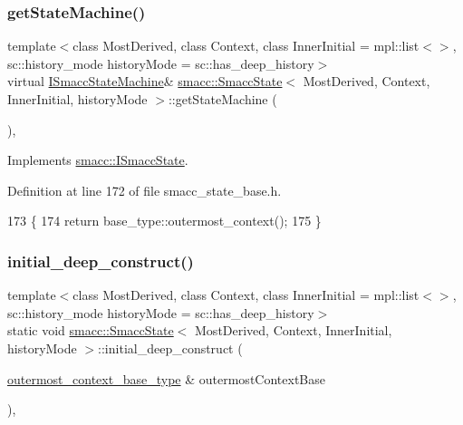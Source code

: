 \subsubsection{\texorpdfstring{get\+State\+Machine()}{getStateMachine()}}
{\footnotesize\ttfamily template$<$class Most\+Derived, class Context, class Inner\+Initial = mpl\+::list$<$$>$, sc\+::history\+\_\+mode history\+Mode = sc\+::has\+\_\+deep\+\_\+history$>$ \\
virtual \hyperlink{classsmacc_1_1ISmaccStateMachine}{I\+Smacc\+State\+Machine}\& \hyperlink{classsmacc_1_1SmaccState}{smacc\+::\+Smacc\+State}$<$ Most\+Derived, Context, Inner\+Initial, history\+Mode $>$\+::get\+State\+Machine (\begin{DoxyParamCaption}{ }\end{DoxyParamCaption})\hspace{0.3cm}{\ttfamily [inline]}, {\ttfamily [virtual]}}



Implements \hyperlink{classsmacc_1_1ISmaccState_a562bb3f9a3ac16b8be71e4794c9e7523}{smacc\+::\+I\+Smacc\+State}.



Definition at line 172 of file smacc\+\_\+state\+\_\+base.\+h.


\begin{DoxyCode}
173   \{
174     \textcolor{keywordflow}{return} base\_type::outermost\_context();
175   \}
\end{DoxyCode}
\mbox{\label{classsmacc_1_1SmaccState_af4b4635d16a32bdd3956e5d40ddbd01d}} 
\subsubsection{\texorpdfstring{initial\+\_\+deep\+\_\+construct()}{initial\_deep\_construct()}}
{\footnotesize\ttfamily template$<$class Most\+Derived, class Context, class Inner\+Initial = mpl\+::list$<$$>$, sc\+::history\+\_\+mode history\+Mode = sc\+::has\+\_\+deep\+\_\+history$>$ \\
static void \hyperlink{classsmacc_1_1SmaccState}{smacc\+::\+Smacc\+State}$<$ Most\+Derived, Context, Inner\+Initial, history\+Mode $>$\+::initial\+\_\+deep\+\_\+construct (\begin{DoxyParamCaption}\item[{\hyperlink{classsmacc_1_1SmaccState_aaf76bbe2aa9dd73e3284605f84ab4b16}{outermost\+\_\+context\+\_\+base\+\_\+type} \&}]{outermost\+Context\+Base }\end{DoxyParamCaption})\hspace{0.3cm}{\ttfamily [inline]}, {\ttfamily [static]}}



